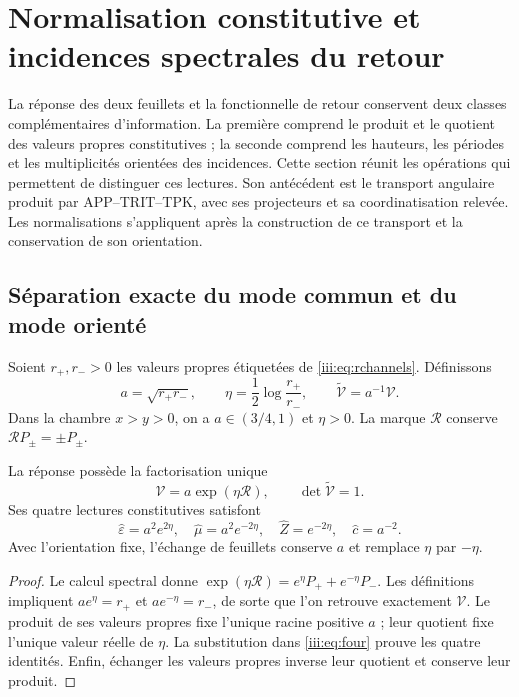 \section{Normalisation constitutive et incidences spectrales du retour}
\label{iii:sec:incidencias-espectrales}

La réponse des deux feuillets et la fonctionnelle de retour conservent deux
classes complémentaires d’information. La première comprend le produit
et le quotient des valeurs propres constitutives ; la seconde comprend les
hauteurs, les périodes et les multiplicités orientées des incidences.
Cette section réunit les opérations qui permettent de distinguer ces lectures.
Son antécédent est le transport angulaire produit par APP--TRIT--TPK,
avec ses projecteurs et sa coordinatisation relevée. Les normalisations s’appliquent
après la construction de ce transport et la conservation de son orientation.

\subsection{Séparation exacte du mode commun et du mode orienté}

Soient $r_+,r_->0$ les valeurs propres étiquetées de
\eqref{iii:eq:rchannels}. Définissons
\begin{equation}
 a=\sqrt{r_+r_-},\qquad
 \eta=\frac12\log\frac{r_+}{r_-},\qquad
 \widetilde{\mathcal V}=a^{-1}\mathcal V.
 \label{iii:eq:rec27-normalizacion}
\end{equation}
Dans la chambre $x>y>0$, on a $a\in(3/4,1)$ et $\eta>0$.
La marque $\mathcal R$ conserve $\mathcal R P_\pm=\pm P_\pm$.

\begin{proposition}
\label{iii:prop:rec27-factorizacion}
La réponse possède la factorisation unique
\begin{equation}
 \mathcal V=a\exp(\eta\mathcal R),\qquad
 \det\widetilde{\mathcal V}=1.
 \label{iii:eq:rec27-unimodular}
\end{equation}
Ses quatre lectures constitutives satisfont
\begin{equation}
 \widehat\varepsilon=a^2e^{2\eta},\quad
 \widehat\mu=a^2e^{-2\eta},\quad
 \widehat Z=e^{-2\eta},\quad
 \widehat c=a^{-2}.
 \label{iii:eq:rec27-cuatro}
\end{equation}
Avec l’orientation fixe, l’échange de feuillets conserve $a$ et remplace
$\eta$ par $-\eta$.
\end{proposition}
\begin{proof}
Le calcul spectral donne
$\exp(\eta\mathcal R)=e^\eta P_++e^{-\eta}P_-$.
Les définitions impliquent $ae^\eta=r_+$ et $ae^{-\eta}=r_-$,
de sorte que l’on retrouve exactement $\mathcal V$.
Le produit de ses valeurs propres fixe l’unique racine positive $a$ ;
leur quotient fixe l’unique valeur réelle de $\eta$.
La substitution dans \eqref{iii:eq:four} prouve les quatre identités.
Enfin, échanger les valeurs propres inverse leur quotient et conserve
leur produit.
\end{proof}

